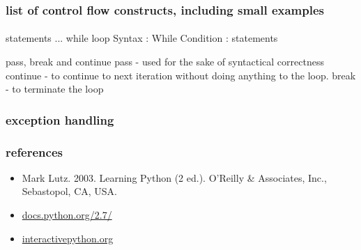 \documentclass{beamer}
\begin{document}
\begin{frame}
\frametitle{list of control flow constructs, including small examples}
\framesubtitle{}
%
%
               statements
               ...
while loop
Syntax : While Condition :
            statements 

pass, break and continue
pass - used for the sake of syntactical correctness
continue - to continue to next iteration without doing anything to the loop.
break - to terminate the loop
\end{frame}

\begin{frame}
\frametitle{exception handling}
\framesubtitle{}
  
\end{frame}


%         




\begin{frame}
 \frametitle{references}
 \begin{itemize}
  \item Mark Lutz. 2003. Learning Python (2 ed.). O'Reilly \& Associates, Inc., Sebastopol, CA, USA.
  \item \href{https://docs.python.org/2.7/}{docs.python.org/2.7/}
  \item \href{http://interactivepython.org}{interactivepython.org}
 \end{itemize}
\end{frame}
\end{document}
